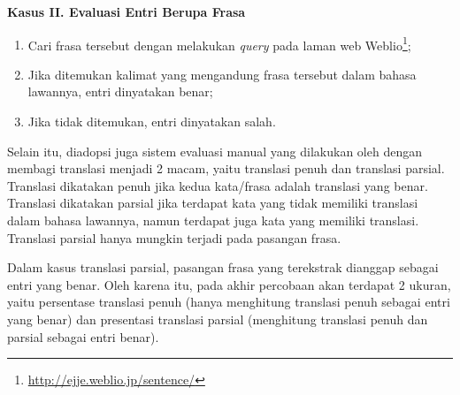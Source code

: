 \documentclass[../main/main.tex]{subfiles}
\begin{document}
\textbf{Kasus II. Evaluasi Entri Berupa Frasa}
\begin{enumerate}
\item Cari frasa tersebut dengan melakukan \textit{query} pada laman web Weblio\footnote{\url{http://ejje.weblio.jp/sentence/}};
\item Jika ditemukan kalimat yang mengandung frasa tersebut dalam bahasa lawannya, entri dinyatakan benar;
\item Jika tidak ditemukan, entri dinyatakan salah.
\end{enumerate}

Selain itu, diadopsi juga sistem evaluasi manual yang dilakukan oleh \textcite{aker} dengan membagi translasi menjadi 2 macam, yaitu translasi penuh dan translasi parsial. Translasi dikatakan penuh jika kedua kata/frasa adalah translasi yang benar. Translasi dikatakan parsial jika terdapat kata yang tidak memiliki translasi dalam bahasa lawannya, namun terdapat juga kata yang memiliki translasi. Translasi parsial hanya mungkin terjadi pada pasangan frasa.

Dalam kasus translasi parsial, pasangan frasa yang terekstrak dianggap sebagai entri yang benar. Oleh karena itu, pada akhir percobaan akan terdapat 2 ukuran, yaitu persentase translasi penuh (hanya menghitung translasi penuh sebagai entri yang benar) dan presentasi translasi parsial (menghitung translasi penuh dan parsial sebagai entri benar).
\end{document}
